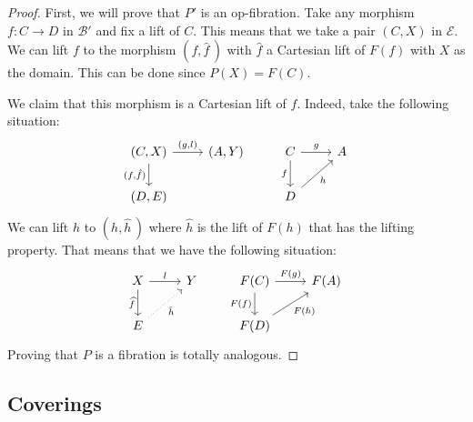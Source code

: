 \documentclass[12pt,reqno]{amsart}
\theoremstyle{definition}
\theoremstyle{remark}
\numberwithin{figure}{section}%
\newcommand{\Ba}{\mathcal{B}}
\newcommand{\co}{\colon}
\newcommand{\E}{\mathcal{E}}
\begin{document}
\begin{proof}
First, we will prove that $P'$ is an op-fibration.  Take any morphism $f\co C \rightarrow D$ in $\Ba'$ and fix a lift of $C$. This means that we take a pair $(C,X)$ in $\E$. We can lift $f$ to the morphism $(f,\hat{f}\,)$ with $\hat{f}$ a Cartesian lift of $F(f)$ with $X$ as the domain. This can be done since $P(X)=F(C)$. 

We claim that this morphism is a Cartesian lift of $f$. Indeed, take the following situation:
    $$
\begin{tikzcd}%
{(C,X)} \arrow[d, "{(f,\hat{f})}"'] \arrow[r, "{(g,l)}"] & {(A,Y)} & C \arrow[d, "f"'] \arrow[r, "g"] & A \\
{(D,E)}                                                  &         & D \arrow[ru, "h"']              &  
\end{tikzcd}
    $$
    We can lift $h$ to $(h,\hat{h}\,)$ where $\hat{h}$ is the lift of $F(h)$ that has the lifting property. That means that we have the following situation: 
    $$
\begin{tikzcd}%
X \arrow[d, "\widehat{f}"'] \arrow[r, "l"] & Y & F(C) \arrow[d, "F(f)"'] \arrow[r, "F(g)"] & F(A) \\
E \arrow[ru, "\hat{h}"', dotted]       & \quad  & F(D) \arrow[ru, "F(h)"']                 &     
\end{tikzcd}
$$
Proving that $P$ is a fibration is totally analogous.
\end{proof}



\subsection{Coverings}
\end{document}
